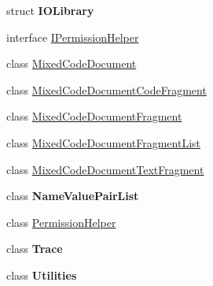 \begin{DoxyCompactItemize}
struct {\bfseries I\+O\+Library}
\item 
interface \hyperlink{interface_html_agility_pack_1_1_i_permission_helper}{I\+Permission\+Helper}
\item 
class \hyperlink{class_html_agility_pack_1_1_mixed_code_document}{Mixed\+Code\+Document}
\item 
class \hyperlink{class_html_agility_pack_1_1_mixed_code_document_code_fragment}{Mixed\+Code\+Document\+Code\+Fragment}
\item 
class \hyperlink{class_html_agility_pack_1_1_mixed_code_document_fragment}{Mixed\+Code\+Document\+Fragment}
\item 
class \hyperlink{class_html_agility_pack_1_1_mixed_code_document_fragment_list}{Mixed\+Code\+Document\+Fragment\+List}
\item 
class \hyperlink{class_html_agility_pack_1_1_mixed_code_document_text_fragment}{Mixed\+Code\+Document\+Text\+Fragment}
\item 
class {\bfseries Name\+Value\+Pair\+List}
\item 
class \hyperlink{class_html_agility_pack_1_1_permission_helper}{Permission\+Helper}
\item 
class {\bfseries Trace}
\item 
class {\bfseries Utilities}
\end{DoxyCompactItemize}
